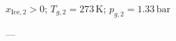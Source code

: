\( x_{\text{Ice},2} > 0 \); \( T_{g,2} = 273 \, \text{K} \); \( p_{g,2} = 1.33 \, \text{bar} \)  

---
